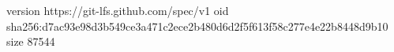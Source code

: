 version https://git-lfs.github.com/spec/v1
oid sha256:d7ac93e98d3b549ce3a471c2ece2b480d6d2f5f613f58c277e4e22b8448d9b10
size 87544
